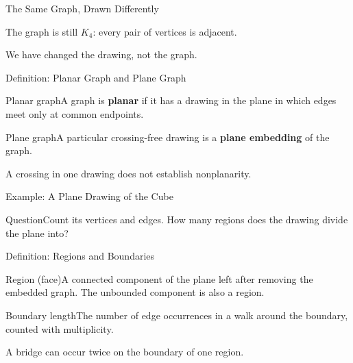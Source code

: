 \documentclass[aspectratio=169,11pt]{beamer}
\newcommand{\Def}[2]{\begin{block}{#1}#2\end{block}}
\newcommand{\Question}[1]{\begin{block}{Question}#1\end{block}}
\newcommand{\gap}{\par\medskip}
\begin{document}
\begin{frame}{The Same Graph, Drawn Differently}
\large
\begin{center}\end{center}
The graph is still $K_4$: every pair of vertices is adjacent.
\gap We have changed the drawing, not the graph.
\end{frame}
\begin{frame}{Definition: Planar Graph and Plane Graph}
\large
\Def{Planar graph}{A graph is \textbf{planar} if it has a drawing in the plane in which edges meet only at common endpoints.}
\Def{Plane graph}{A particular crossing-free drawing is a \textbf{plane embedding} of the graph.}
\gap A crossing in one drawing does not establish nonplanarity.
\end{frame}
\begin{frame}{Example: A Plane Drawing of the Cube}
\large
\begin{center}\end{center}
\Question{Count its vertices and edges. How many regions does the drawing divide the plane into?}
\end{frame}
\begin{frame}{Definition: Regions and Boundaries}
\large
\Def{Region (face)}{A connected component of the plane left after removing the embedded graph. The unbounded component is also a region.}
\Def{Boundary length}{The number of edge occurrences in a walk around the boundary, counted with multiplicity.}
\gap A bridge can occur twice on the boundary of one region.
\end{frame}
\end{document}
